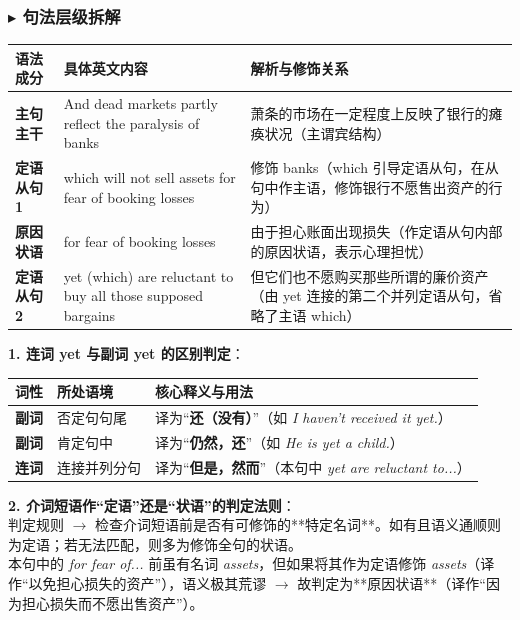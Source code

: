 \documentclass[cn,normal,11pt]{elegantnote}
\begin{document}
\subsubsection*{$\blacktriangleright$ 句法层级拆解}
\noindent
\begin{tabularx}{\textwidth}{p{3.2cm} X X}
  \toprule
  \textbf{语法成分} & \textbf{具体英文内容} & \textbf{解析与修饰关系} \\
  \midrule
  \textbf{主句主干} & And dead markets partly reflect the paralysis of banks & 萧条的市场在一定程度上反映了银行的瘫痪状况（主谓宾结构） \\
  \midrule
  \textbf{定语从句 1} & which will not sell assets for fear of booking losses & 修饰 banks（which 引导定语从句，在从句中作主语，修饰银行不愿售出资产的行为） \\
  \midrule
  \textbf{原因状语} & for fear of booking losses & 由于担心账面出现损失（作定语从句内部的原因状语，表示心理担忧） \\
  \midrule
  \textbf{定语从句 2} & yet (which) are reluctant to buy all those supposed bargains & 但它们也不愿购买那些所谓的廉价资产（由 yet 连接的第二个并列定语从句，省略了主语 which） \\
  \bottomrule
\end{tabularx}

\begin{proposition}
  \textbf{1. 连词 yet 与副词 yet 的区别判定}：
  \begin{table}[H]
    \centering
    \small
    \begin{tabularx}{\textwidth}{p{2.5cm} p{2.8cm} X}
      \toprule
      \textbf{词性} & \textbf{所处语境} & \textbf{核心释义与用法} \\
      \midrule
      \textbf{副词} & 否定句句尾 & 译为“\textbf{还（没有）}”（如 \textit{I haven't received it yet.}） \\
      \textbf{副词} & 肯定句中 & 译为“\textbf{仍然，还}”（如 \textit{He is yet a child.}） \\
      \textbf{连词} & 连接并列分句 & 译为“\textbf{但是，然而}”（本句中 \textit{yet are reluctant to...}） \\
      \bottomrule
    \end{tabularx}
  \end{table}
  \textbf{2. 介词短语作“定语”还是“状语”的判定法则}：\\
  判定规则 $\rightarrow$ 检查介词短语前是否有可修饰的**特定名词**。如有且语义通顺则为定语；若无法匹配，则多为修饰全句的状语。\\
  本句中的 \textit{for fear of...} 前虽有名词 \textit{assets}，但如果将其作为定语修饰 \textit{assets}（译作“以免担心损失的资产”），语义极其荒谬 $\rightarrow$ 故判定为**原因状语**（译作“因为担心损失而不愿出售资产”）。
\end{proposition}
\end{document}
